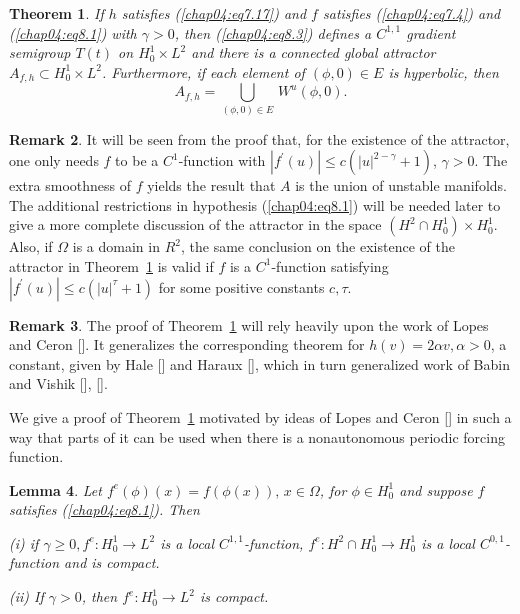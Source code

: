 \documentclass{surv-l}
\theoremstyle{plain}
\newtheorem{theorem}{Theorem}[section]
\newtheorem{lemma}[theorem]{Lemma}
\theoremstyle{definition}
\newtheorem{remark}[theorem]{Remark}
\numberwithin{equation}{section}
\numberwithin{figure}{chapter}
\begin{document}
\begin{theorem}\label{thm4.8.1} If $h$ satisfies \emph{(\ref{chap04:eq7.17})} and $f$ satisfies \emph{(\ref{chap04:eq7.4})} and \emph{(\ref{chap04:eq8.1})} with $\gamma>0$, then \emph{(\ref{chap04:eq8.3})} defines a $C^{1,1}$ gradient semigroup $T(t)$ on $H_{0}^{1}\times L^{2}$ and there is a connected global attractor $A_{f,h}\subset H_{0}^{1}\times L^{2}$. Furthermore, if each element of $(\phi, 0)\in E$ is hyperbolic, then
\begin{equation*}
A_{f, h}= \bigcup_{(\phi,0)\in E}\, W^{u}(\phi, 0).
\end{equation*}
\end{theorem}
\begin{remark}\label{rem4.8.2} It will be seen from the proof that, for the existence of the attractor, one only needs $f$ to be a $C^{1}$-function with $|f^{\prime}(u)|\leq c(|u|^{2-\gamma}+1)$, $\gamma>0$. The extra smoothness of $f$ yields the result that $A$ is the union of unstable manifolds. The additional restrictions in hypothesis (\ref{chap04:eq8.1}) will be needed later to give a more complete discussion of the attractor in the space $(H^{2}\cap H_{0}^{1})\times H_{0}^{1}$. Also, if $\Omega$ is a domain in $R^{2}$, the same conclusion on the existence of the attractor in Theorem~\ref{thm4.8.1} is valid if $f$ is a $C^{1}$-function satisfying $|f^{\prime}(u)|\leq c(|u|^{\tau}+1)$ for some positive constants $c, \tau$.\end{remark}

\begin{remark}\label{rem4.8.3} The proof of Theorem~\ref{thm4.8.1} will rely heavily upon the work of Lopes and Ceron [\citeyear{1984lc}]. It generalizes the corresponding theorem for $h(v)= 2\alpha v, \alpha>0$, a constant, given by Hale [\citeyear{1985h}] and Haraux [\citeyear{1985haraux}], which in turn generalized work of Babin and Vishik [\citeyear{1983bv}], [\citeyear{1985bv}].

We give a proof of Theorem~\ref{thm4.8.1} motivated by ideas of Lopes and Ceron [\citeyear{1984lc}] in such a way that parts of it can be used when there is a nonautonomous periodic forcing function.
\end{remark}

\begin{lemma}\label{lem4.8.4} Let $f^{e}(\phi)(x)=f(\phi(x)),\, x\in\Omega$, for $\phi\in H_{0}^{1}$ and suppose $f$ satisfies \emph{(\ref{chap04:eq8.1})}. Then

\emph{(i)} if $\gamma\geq 0, f^{e}\!:H_{0}^{1}\rightarrow L^{2}$ is a local $C^{1,1}$-function, $f^{e}\!:H^{2}\cap H_{0}^{1}\rightarrow H_{0}^{1}$ is a local $C^{0,1}$-function and is compact.

\emph{(ii)} If $\gamma>0$, then $f^{e}\!:H_{0}^{1}\rightarrow L^{2}$ is compact.
\end{lemma}
\end{document}
